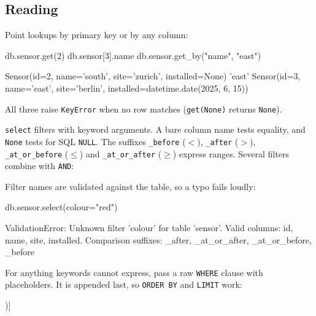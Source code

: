 \documentclass[11pt,a4paper]{article}
\newcommand{\code}[1]{\texttt{#1}}
\begin{document}
\subsection{Reading}

Point lookups by primary key or by any column:

\begin{python}
db.sensor.get(2)
db.sensor[3].name
db.sensor.get_by("name", "east")
\end{python}
\begin{console}
Sensor(id=2, name='south', site='zurich', installed=None)
'east'
Sensor(id=3, name='east', site='berlin', installed=datetime.date(2025, 6, 15))
\end{console}

All three raise \code{KeyError} when no row matches (\code{get(None)} returns \code{None}).

\code{select} filters with keyword arguments. A bare column name tests equality, and
\code{None} tests for SQL \code{NULL}. The suffixes \code{\_before} ($<$), \code{\_after}
($>$), \code{\_at\_or\_before} ($\le$) and \code{\_at\_or\_after} ($\ge$) express ranges.
Several filters combine with \code{AND}:

\begin{python}
[s.id for s in db.sensor.select(site="berlin")]
[s.id for s in db.sensor.select(installed=None)]
[s.id for s in db.sensor.select(installed_after=date(2025, 1, 1))]
[s.id for s in db.sensor.select(site="berlin", id_at_or_before=2)]
\end{python}
\begin{console}
[1, 3]
[2]
[3]
[1]
\end{console}

Filter names are validated against the table, so a typo fails loudly:

\begin{python}
db.sensor.select(colour="red")
\end{python}
\begin{console}
ValidationError: Unknown filter 'colour' for table 'sensor'. Valid columns: id, name,
site, installed. Comparison suffixes: _after, _at_or_after, _at_or_before, _before
\end{console}

For anything keywords cannot express, pass a raw \code{WHERE} clause with placeholders.
It is appended last, so \code{ORDER BY} and \code{LIMIT} work:

\begin{python}
[s.name for s in db.sensor.select("site = ? ORDER BY name", ["berlin"])]
\end{python}
\begin{console}
\end{console}
\end{document}
